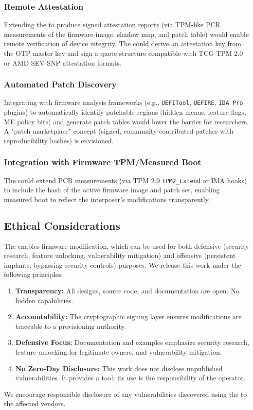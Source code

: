 \subsubsection{Remote Attestation}
Extending the \vbfc to produce signed attestation reports (via \ac{TPM}-like PCR measurements of the firmware image, shadow map, and patch table) would enable remote verification of device integrity. The \rp could derive an attestation key from the OTP master key and sign a quote structure compatible with TCG TPM 2.0 or AMD SEV-SNP attestation formats.

\subsubsection{Automated Patch Discovery}
Integrating with firmware analysis frameworks (e.g., \texttt{UEFITool}, \texttt{UEFIRE}, \texttt{IDA Pro} plugins) to automatically identify patchable regions (hidden menus, feature flags, \ac{ME} policy bits) and generate patch tables would lower the barrier for researchers. A "patch marketplace" concept (signed, community-contributed patches with reproducibility hashes) is envisioned.

\subsubsection{Integration with Firmware TPM/Measured Boot}
The \vbfc could extend \ac{PCR} measurements (via \ac{TPM} 2.0 \texttt{TPM2\_Extend} or \ac{IMA} hooks) to include the hash of the active firmware image and patch set, enabling measured boot to reflect the interposer's modifications transparently.

\subsection{Ethical Considerations}
The \vbfc enables firmware modification, which can be used for both defensive (security research, feature unlocking, vulnerability mitigation) and offensive (persistent implants, bypassing security controls) purposes. We release this work under the following principles:
\begin{enumerate}
    \item \textbf{Transparency:} All designs, source code, and documentation are open. No hidden capabilities.
    \item \textbf{Accountability:} The cryptographic signing layer ensures modifications are traceable to a provisioning authority.
    \item \textbf{Defensive Focus:} Documentation and examples emphasize security research, feature unlocking for legitimate owners, and vulnerability mitigation.
    \item \textbf{No Zero-Day Disclosure:} This work does not disclose unpublished vulnerabilities. It provides a tool; its use is the responsibility of the operator.
\end{enumerate}
We encourage responsible disclosure of any vulnerabilities discovered using the \vbfc to the affected vendors.